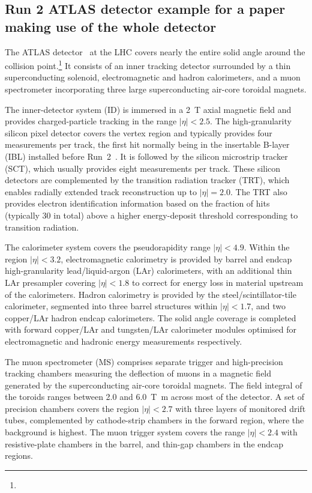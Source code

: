 \subsection{Run 2 ATLAS detector example for a paper making use of the whole detector}
\label{sec:atlas2b}

The ATLAS detector~\cite{PERF-2007-01} at the LHC covers nearly the entire solid angle around the collision point.\footnote{\AtlasCoordFootnote}
It consists of an inner tracking detector surrounded by a thin superconducting solenoid, electromagnetic and hadron calorimeters,
and a muon spectrometer incorporating three large superconducting air-core toroidal magnets.

The inner-detector system (ID) is immersed in a \SI{2}{\tesla} axial magnetic field 
and provides charged-particle tracking in the range \(|\eta| < 2.5\).
The high-granularity silicon pixel detector covers the vertex region and typically provides four measurements per track, 
the first hit normally being in the insertable B-layer (IBL) installed before Run~2~\cite{ATLAS-TDR-19,PIX-2018-001}.
It is followed by the silicon microstrip tracker (SCT), which usually provides eight measurements per track.
These silicon detectors are complemented by the transition radiation tracker (TRT),
which enables radially extended track reconstruction up to \(|\eta| = 2.0\). 
The TRT also provides electron identification information 
based on the fraction of hits (typically 30 in total) above a higher energy-deposit threshold corresponding to transition radiation.

The calorimeter system covers the pseudorapidity range \(|\eta| < 4.9\).
Within the region \(|\eta|< 3.2\), electromagnetic calorimetry is provided by barrel and 
endcap high-granularity lead/liquid-argon (LAr) calorimeters,
with an additional thin LAr presampler covering \(|\eta| < 1.8\)
to correct for energy loss in material upstream of the calorimeters.
Hadron calorimetry is provided by the steel/scintillator-tile calorimeter,
segmented into three barrel structures within \(|\eta| < 1.7\), and two copper/LAr hadron endcap calorimeters.
The solid angle coverage is completed with forward copper/LAr and tungsten/LAr calorimeter modules
optimised for electromagnetic and hadronic energy measurements respectively.

The muon spectrometer (MS) comprises separate trigger and
high-precision tracking chambers measuring the deflection of muons in a magnetic field generated by the superconducting air-core toroidal magnets.
The field integral of the toroids ranges between \num{2.0} and \SI{6.0}{\tesla\metre}
across most of the detector. 
A set of precision chambers covers the region \(|\eta| < 2.7\) with three layers of monitored drift tubes,
complemented by cathode-strip chambers in the forward region, where the background is highest.
The muon trigger system covers the range \(|\eta| < 2.4\) with resistive-plate chambers in the barrel, and thin-gap chambers in the endcap regions.

